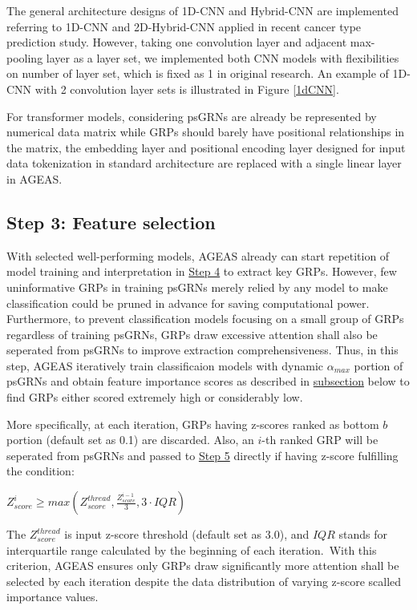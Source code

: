 \documentclass[fleqn,10pt]{wlscirep}
\begin{document}
    The general architecture designs of 1D-CNN and Hybrid-CNN are implemented referring to 1D-CNN and 2D-Hybrid-CNN applied in recent cancer type prediction study.\cite{mostavi_chiu_huang_chen_2020}
    However, taking one convolution layer and adjacent max-pooling layer as a layer set, we implemented both CNN models with flexibilities on number of layer set, which is fixed as 1 in original research.
    An example of 1D-CNN with 2 convolution layer sets is illustrated in Figure \ref{1dCNN}.

    For transformer models, considering psGRNs are already be represented by numerical data matrix while GRPs should barely have positional relationships in the matrix, the embedding layer and positional encoding layer designed for input data tokenization in standard architecture \cite{transformer} are replaced with a single linear layer in AGEAS.

  \subsection*{Step 3: Feature selection}
    \label{step3}
    With selected well-performing models, AGEAS already can start repetition of model training and interpretation in \hyperref[step4]{Step 4} to extract key GRPs.
    However, few uninformative GRPs in training psGRNs merely relied by any model to make classification could be pruned in advance for saving computational power.
    Furthermore, to prevent classification models focusing on a small group of GRPs regardless of training psGRNs, GRPs draw excessive attention shall also be seperated from psGRNs to improve extraction comprehensiveness.
    Thus, in this step, AGEAS iteratively train classificaion models with dynamic $\alpha_{max}$ portion of psGRNs and obtain feature importance scores as described in \hyperref[features_importances]{subsection} below to find GRPs either scored extremely high or considerably low.

    More specifically, at each iteration, GRPs having z-scores ranked as bottom $b$ portion (default set as 0.1) are discarded.
    Also, an $i$-th ranked GRP will be seperated from psGRNs and passed to \hyperref[step5]{Step 5} directly if having z-score fulfilling the condition:

    \centerline{
      $Z_{score}^{i} \ge max(Z_{score}^{thread}, \frac{Z_{score}^{i-1}}{3}, 3 \cdot IQR)$
    }

    \noindent The $Z_{score}^{thread}$ is input z-score threshold (default set as 3.0), and $IQR$ stands for interquartile range calculated by the beginning of each iteration.\
    With this criterion, AGEAS ensures only GRPs draw significantly more attention shall be selected by each iteration despite the data distribution of varying z-score scalled importance values.
\end{document}
